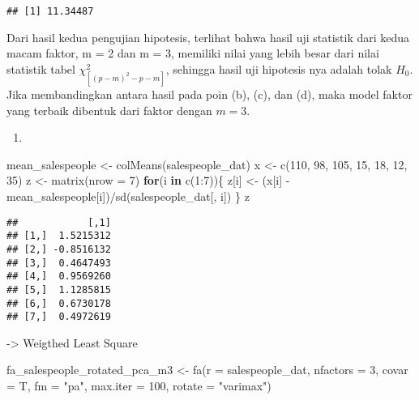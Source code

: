 \documentclass[
]{article}
\newenvironment{Shaded}{\begin{snugshade}}{\end{snugshade}}
\newcommand{\AttributeTok}[1]{\textcolor[rgb]{0.77,0.63,0.00}{#1}}
\newcommand{\ControlFlowTok}[1]{\textcolor[rgb]{0.13,0.29,0.53}{\textbf{#1}}}
\newcommand{\DecValTok}[1]{\textcolor[rgb]{0.00,0.00,0.81}{#1}}
\newcommand{\FunctionTok}[1]{\textcolor[rgb]{0.00,0.00,0.00}{#1}}
\newcommand{\NormalTok}[1]{#1}
\newcommand{\OtherTok}[1]{\textcolor[rgb]{0.56,0.35,0.01}{#1}}
\newcommand{\SpecialCharTok}[1]{\textcolor[rgb]{0.00,0.00,0.00}{#1}}
\newcommand{\StringTok}[1]{\textcolor[rgb]{0.31,0.60,0.02}{#1}}
\providecommand{\tightlist}{%
  \setlength{\itemsep}{0pt}\setlength{\parskip}{0pt}}
\begin{document}
\begin{verbatim}
## [1] 11.34487
\end{verbatim}

Dari hasil kedua pengujian hipotesis, terlihat bahwa hasil uji statistik
dari kedua macam faktor, m = 2 dan m = 3, memiliki nilai yang lebih
besar dari nilai statistik tabel \(\chi^2_{[(p-m)^2 - p - m]}\),
sehingga hasil uji hipotesis nya adalah tolak \(H_{0}\). Jika
membandingkan antara hasil pada poin (b), (c), dan (d), maka model
faktor yang terbaik dibentuk dari faktor dengan \(m = 3\).

\begin{enumerate}
\def\labelenumi{\alph{enumi}.}
\setcounter{enumi}{4}
\tightlist
\item
\end{enumerate}

\begin{Shaded}
\begin{Highlighting}[]
\NormalTok{mean\_salespeople }\OtherTok{\textless{}{-}} \FunctionTok{colMeans}\NormalTok{(salespeople\_dat)}
\NormalTok{x }\OtherTok{\textless{}{-}} \FunctionTok{c}\NormalTok{(}\DecValTok{110}\NormalTok{, }\DecValTok{98}\NormalTok{, }\DecValTok{105}\NormalTok{, }\DecValTok{15}\NormalTok{, }\DecValTok{18}\NormalTok{, }\DecValTok{12}\NormalTok{, }\DecValTok{35}\NormalTok{)}
\NormalTok{z }\OtherTok{\textless{}{-}} \FunctionTok{matrix}\NormalTok{(}\AttributeTok{nrow =} \DecValTok{7}\NormalTok{)}
\ControlFlowTok{for}\NormalTok{(i }\ControlFlowTok{in} \FunctionTok{c}\NormalTok{(}\DecValTok{1}\SpecialCharTok{:}\DecValTok{7}\NormalTok{))\{}
\NormalTok{  z[i] }\OtherTok{\textless{}{-}}\NormalTok{ (x[i] }\SpecialCharTok{{-}}\NormalTok{ mean\_salespeople[i])}\SpecialCharTok{/}\FunctionTok{sd}\NormalTok{(salespeople\_dat[, i])}
\NormalTok{\}}
\NormalTok{z}
\end{Highlighting}
\end{Shaded}

\begin{verbatim}
##            [,1]
## [1,]  1.5215312
## [2,] -0.8516132
## [3,]  0.4647493
## [4,]  0.9569260
## [5,]  1.1285815
## [6,]  0.6730178
## [7,]  0.4972619
\end{verbatim}

-\textgreater{} Weigthed Least Square

\begin{Shaded}
\begin{Highlighting}[]
\NormalTok{fa\_salespeople\_rotated\_pca\_m3 }\OtherTok{\textless{}{-}} \FunctionTok{fa}\NormalTok{(}\AttributeTok{r =}\NormalTok{ salespeople\_dat, }\AttributeTok{nfactors =} \DecValTok{3}\NormalTok{, }\AttributeTok{covar =}\NormalTok{ T, }\AttributeTok{fm =} \StringTok{"pa"}\NormalTok{, }\AttributeTok{max.iter =} \DecValTok{100}\NormalTok{, }\AttributeTok{rotate =} \StringTok{"varimax"}\NormalTok{)}
\end{Highlighting}
\end{Shaded}
\end{document}
